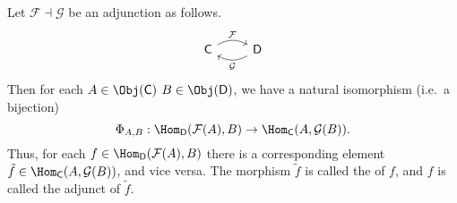 \documentclass[main.tex]{subfiles}
\begin{document}
\begin{definition}[adjunct]
  \label{def:adjunct}
  Let $\mathcal{F} \dashv \mathcal{G}$ be an adjunction as follows.
  \begin{equation*}
    \begin{tikzcd}
      \mathsf{C}
      \arrow[r, bend left, rightarrow, "\mathcal{F}"]
      & \mathsf{D}
      \arrow[l, bend left, rightarrow, "\mathcal{G}"]
    \end{tikzcd}
  \end{equation*}
  Then for each $A \in \Obj(\mathsf{C})$ $B \in \Obj(\mathsf{D})$, we have a natural isomorphism (i.e.\ a bijection)
  \begin{equation*}
    \Phi_{A, B}: \Hom_{\mathsf{D}}(\mathcal{F}(A), B) \to \Hom_{\mathsf{C}}(A, \mathcal{G}(B)).
  \end{equation*}
  Thus, for each $f \in \Hom_{\mathsf{D}}(\mathcal{F}(A), B)$ there is a corresponding element $\tilde{f} \in \Hom_{\mathsf{C}}(A, \mathcal{G}(B))$, and vice versa. The morphism $\tilde{f}$ is called the  of $f$, and $f$ is called the adjunct of $\tilde{f}$.
\end{definition}
\end{document}
